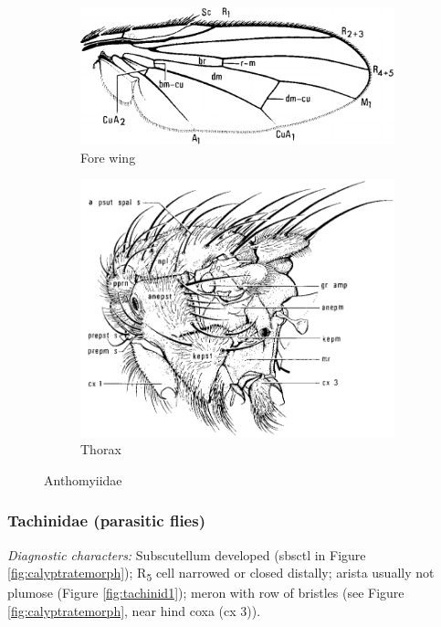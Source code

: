 \documentclass[letterpaper, 11pt]{article}
\begin{document}
\begin{figure}[ht!]
    \centering
    \begin{subfigure}[ht!]{0.4\textwidth}
        \includegraphics[width=\textwidth]{AnthomyiidWing}
        \caption{Fore wing \citep[][Fig. 104.29]{mcalpine1981manualv2}}
        \label{fig:anthomyiid1}
    \end{subfigure}
    \qquad
    \begin{subfigure}[ht!]{0.4\textwidth}
        \includegraphics[width=\textwidth]{AnthomyiidThorax}
        \caption{Thorax \citep[][Fig. 104.18]{mcalpine1981manualv2}}
        \label{fig:anthomyiid2}
    \end{subfigure}
    \caption{Anthomyiidae}\label{fig:anthomyiids}
\end{figure}

\subsubsection{Tachinidae (parasitic flies)}
\noindent{}\textit{Diagnostic characters:} Subscutellum developed (sbsctl in Figure \ref{fig:calyptratemorph}); \texorpdfstring{R\textsubscript{5}}{R5} cell narrowed or closed distally; arista usually not plumose (Figure \ref{fig:tachinid1}); meron with row of bristles (see Figure \ref{fig:calyptratemorph}, near hind coxa (cx 3)).\\
\end{document}

